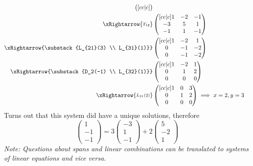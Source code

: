 \begin{exm}
\begin{flushleft}
\begin{align*}
\begin{pmatrix}[cc|c]
			\end{pmatrix}                 \\
			\xRightarrow{\substack{T_{12}}}
			         & \begin{pmatrix}[cc|c]
				1  & -2 & - 1 \\
				-3 & 5  & 1   \\
				-1 & 1  & -1
			\end{pmatrix}                 \\
			\xRightarrow{\substack{L_{21}(3)                      \\ L_{31}(1)}}
			         & \begin{pmatrix}[cc|c]
				1 & -2 & 1  \\
				0 & -1 & -2 \\
				0 & -1 & -2
			\end{pmatrix}                 \\
			\xRightarrow{\substack{D_2(-1)                        \\ L_{32}(1)}}
			         & \begin{pmatrix}[cc|c]
				1 & -2 & 1 \\
				0 & 1  & 2 \\
				0 & 0  & 0
			\end{pmatrix}                 \\
			\xRightarrow{\substack{L_{21}(2)}}
			         & \begin{pmatrix}[cc|c]
				1 & 0 & 3 \\
				0 & 1 & 2 \\
				0 & 0 & 0
			\end{pmatrix}\implies x=2,y=3 \\
		\end{align*}
		Turns out that this system did have a unique solutions, therefore
		\begin{equation*}
			\begin{pmatrix}
				1 \\-1\\-1
			\end{pmatrix}=3
			\begin{pmatrix}
				-3 \\1\\-1
			\end{pmatrix}+2
			\begin{pmatrix}
				5 \\-2\\1
			\end{pmatrix}
		\end{equation*}
		\textit{Note: Questions about spans and linear combinations can be
			translated to systems of linear equations and vice versa.}
	\end{flushleft}
\end{exm}

